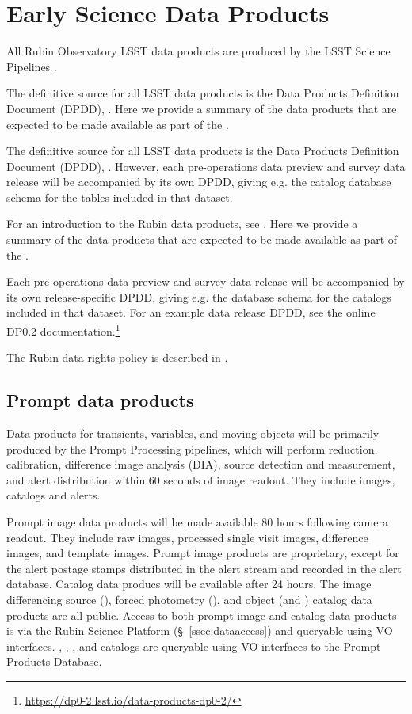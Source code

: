 \section{Early Science Data Products}
\label{sec:data}

All Rubin Observatory LSST data products are produced by the LSST Science Pipelines \cite{2019ASPC..523..521B,2018PASJ...70S...5B}. 

The definitive source for all LSST data products is the Data Products Definition Document (DPDD), \citep{LSE-163}.  
Here we provide a summary of the data products that are expected to be made available as part of the \esp.

The definitive source for all LSST data products is the Data Products Definition Document (DPDD), \citep{LSE-163}.
However, each pre-operations data preview and survey data release will be accompanied by its own DPDD, giving e.g. the catalog database schema for the tables included in that dataset.

For an introduction to the Rubin data products, see \citet{RubinDataProductsAbridged}.
Here we provide a summary of the data products that are expected to be made available as part of the \esp.

Each pre-operations data preview and survey data release will be accompanied by its own release-specific DPDD, giving e.g. the  database schema for the catalogs included in that dataset.
For an example data release DPDD, see the online DP0.2 documentation.\footnote{\url{https://dp0-2.lsst.io/data-products-dp0-2/}}

The Rubin data rights policy is described in  \cite{RDO-013}.

\subsection{Prompt data products}

Data products for transients, variables, and moving objects will be primarily produced by the Prompt Processing pipelines, which will perform reduction, calibration, difference image analysis (DIA), source detection and measurement, and alert distribution within 60 seconds of image readout. 
They include images, catalogs and alerts. 

Prompt image data products will be made available 80 hours following camera readout. 
They include raw images, processed single visit images, difference images, and template images. 
Prompt image products are proprietary, except for the alert postage stamps distributed in the alert stream and recorded in the alert database.
Catalog data producs will be available after 24 hours. 
The image differencing source (\DIASource), forced photometry (\DIAForcedSource), and object (\DIAObject and \SSObject)
catalog data products are all public. 
Access to both prompt image and catalog data products is via the Rubin Science Platform (\S~\ref{ssec:dataaccess}) and queryable using VO interfaces. 
\DIASource, \DIAForcedSource, \DIAObject, and \SSObject catalogs are queryable using VO interfaces to the Prompt Products Database.

